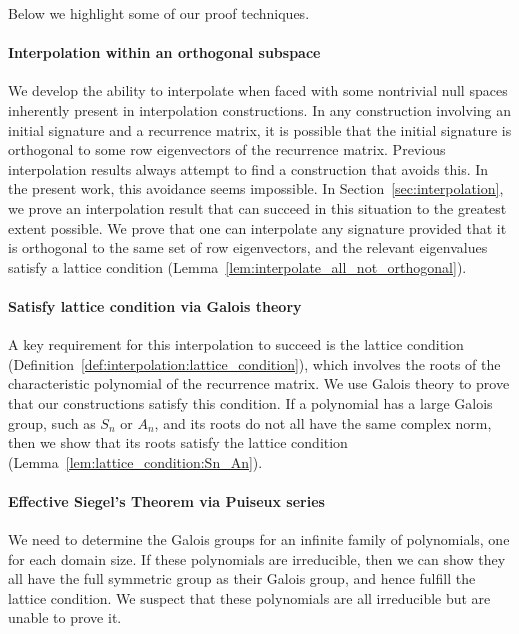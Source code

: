\documentclass[11pt]{article}
\begin{document}
Below we highlight some of our proof techniques.

\paragraph{Interpolation within an orthogonal subspace}
We develop the ability to interpolate when faced with some nontrivial null spaces inherently present in interpolation constructions.
In any construction involving an initial signature and a recurrence matrix,
it is possible that the initial signature is orthogonal to some row eigenvectors of the recurrence matrix.
Previous interpolation results always attempt to find a construction that avoids this.
In the present work,
this avoidance seems impossible.
In Section~\ref{sec:interpolation},
we prove an interpolation result that can succeed in this situation to the greatest extent possible. 
We prove that one can interpolate any signature provided that it is orthogonal to the same set of row eigenvectors,
and the relevant eigenvalues satisfy a lattice condition (Lemma~\ref{lem:interpolate_all_not_orthogonal}).

\paragraph{Satisfy lattice condition via Galois theory}
A key requirement for this interpolation to succeed is the lattice condition (Definition~\ref{def:interpolation:lattice_condition}),
which involves the roots of the characteristic polynomial of the recurrence matrix.
We use Galois theory to prove that our constructions satisfy this condition.
If a polynomial has a large Galois group,
such as $S_n$ or $A_n$,
and its roots do not all have the same complex norm,
then we show that its roots satisfy the lattice condition (Lemma~\ref{lem:lattice_condition:Sn_An}).

\paragraph{Effective Siegel's Theorem via Puiseux series}
We need to determine the Galois groups for an infinite family of polynomials,
one for each domain size.
If these polynomials are irreducible,
then we can show they all have the full symmetric group as their Galois group,
and hence fulfill the lattice condition.
We suspect that these polynomials are all irreducible but are unable to prove it.
\end{document}

